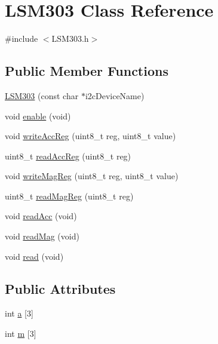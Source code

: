 \hypertarget{class_l_s_m303}{\section{\-L\-S\-M303 \-Class \-Reference}
\label{class_l_s_m303}
}


{\ttfamily \#include $<$\-L\-S\-M303.\-h$>$}

\subsection*{\-Public \-Member \-Functions}
\begin{DoxyCompactItemize}
\item 
\hyperlink{class_l_s_m303_a372710f74d63e809ef08348d919a2842}{\-L\-S\-M303} (const char $\ast$i2c\-Device\-Name)
\item 
void \hyperlink{class_l_s_m303_af2c1baa290df19e7cd4667a13a68a19a}{enable} (void)
\item 
void \hyperlink{class_l_s_m303_a3baf5341cf9d7d789b81b1cec7e81f12}{write\-Acc\-Reg} (uint8\-\_\-t reg, uint8\-\_\-t value)
\item 
uint8\-\_\-t \hyperlink{class_l_s_m303_a26ba086aec95c01c05e6b980383d1ed9}{read\-Acc\-Reg} (uint8\-\_\-t reg)
\item 
void \hyperlink{class_l_s_m303_a70b49953d20ff311bc23dfa8c1ec7a4f}{write\-Mag\-Reg} (uint8\-\_\-t reg, uint8\-\_\-t value)
\item 
uint8\-\_\-t \hyperlink{class_l_s_m303_a5d6d0b492501b76b7fde821036205bda}{read\-Mag\-Reg} (uint8\-\_\-t reg)
\item 
void \hyperlink{class_l_s_m303_ac1396a51b288eadc41fd19fbd79ef68e}{read\-Acc} (void)
\item 
void \hyperlink{class_l_s_m303_abc93e8d8101c6b00df2ae85c5f8ded9e}{read\-Mag} (void)
\item 
void \hyperlink{class_l_s_m303_a9f40456878f534bba32490d19f3a64ce}{read} (void)
\end{DoxyCompactItemize}
\subsection*{\-Public \-Attributes}
\begin{DoxyCompactItemize}
\item 
int \hyperlink{class_l_s_m303_ad71c39fa2c1dfd978c9e93b48a6a9310}{a} \mbox{[}3\mbox{]}
\item 
int \hyperlink{class_l_s_m303_a606cb6a86d385c4c4a9767f6b1bf2ea5}{m} \mbox{[}3\mbox{]}
\end{DoxyCompactItemize}


